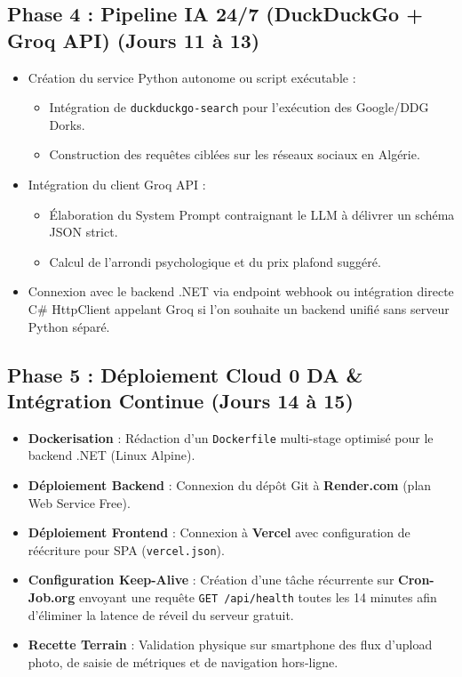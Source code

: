 \documentclass[11pt,a4paper]{article}
\begin{document}
\subsection{Phase 4 : Pipeline IA 24/7 (DuckDuckGo + Groq API) (Jours 11 à 13)}
\begin{itemize}[leftmargin=*]
    \item Création du service Python autonome ou script exécutable :
    \begin{itemize}
        \item Intégration de \texttt{duckduckgo-search} pour l'exécution des Google/DDG Dorks.
        \item Construction des requêtes ciblées sur les réseaux sociaux en Algérie.
    \end{itemize}
    \item Intégration du client Groq API :
    \begin{itemize}
        \item Élaboration du System Prompt contraignant le LLM à délivrer un schéma JSON strict.
        \item Calcul de l'arrondi psychologique et du prix plafond suggéré.
    \end{itemize}
    \item Connexion avec le backend .NET via endpoint webhook ou intégration directe C\# HttpClient appelant Groq si l'on souhaite un backend unifié sans serveur Python séparé.
\end{itemize}

\subsection{Phase 5 : Déploiement Cloud 0 DA \& Intégration Continue (Jours 14 à 15)}
\begin{itemize}[leftmargin=*]
    \item \textbf{Dockerisation} : Rédaction d'un \texttt{Dockerfile} multi-stage optimisé pour le backend .NET (Linux Alpine).
    \item \textbf{Déploiement Backend} : Connexion du dépôt Git à \textbf{Render.com} (plan Web Service Free).
    \item \textbf{Déploiement Frontend} : Connexion à \textbf{Vercel} avec configuration de réécriture pour SPA (\texttt{vercel.json}).
    \item \textbf{Configuration Keep-Alive} : Création d'une tâche récurrente sur \textbf{Cron-Job.org} envoyant une requête \texttt{GET /api/health} toutes les 14 minutes afin d'éliminer la latence de réveil du serveur gratuit.
    \item \textbf{Recette Terrain} : Validation physique sur smartphone des flux d'upload photo, de saisie de métriques et de navigation hors-ligne.
\end{itemize}
\end{document}
